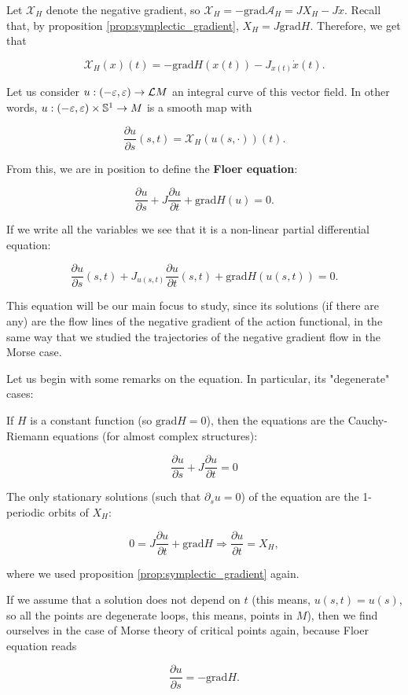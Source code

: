 Let $\mathcal{X}_H$ denote the negative gradient, so $\mathcal{X}_H = - \text{grad}\mathcal{A}_H = J X_H - J \dot{x}$. Recall that, by proposition \ref{prop:symplectic_gradient}, $X_H = J \text{grad} H$. Therefore, we get that

$$\mathcal{X}_H(x)(t) = - \text{grad}H(x(t)) - J_{x(t)} \dot{x}(t) .$$

Let us consider $u : (-\varepsilon,\varepsilon) \rightarrow \mathcal{L}M$ an integral curve of this vector field. In other words, $u : (-\varepsilon,\varepsilon) \times \mathbb{S}^1 \rightarrow M$ is a smooth map with

$$\frac{\partial u}{\partial s} (s,t) = \mathcal{X}_H(u(s,\cdot)) (t) .$$

From this, we are in position to define the {\bf Floer equation}:

\begin{equation} \label{equation:floer_equation}
\frac{\partial u}{\partial s} + J \frac{\partial u}{\partial t} + \text{grad}H(u) = 0 .
\end{equation}

If we write all the variables we see that it is a non-linear partial differential equation:

$$\frac{\partial u}{\partial s}(s,t) + J_{u(s,t)} \frac{\partial u}{\partial t}(s,t) + \text{grad}H(u(s,t)) = 0 .$$

This equation will be our main focus to study, since its solutions (if there are any) are the flow lines of the negative gradient of the action functional, in the same way that we studied the trajectories of the negative gradient flow in the Morse case.

Let us begin with some remarks on the equation. In particular, its "degenerate" cases:

\begin{rmrk}
If $H$ is a constant function (so $\text{grad}H = 0$), then the equations are the Cauchy-Riemann equations (for almost complex structures):

$$\frac{\partial u}{\partial s} + J \frac{\partial u}{\partial t} = 0$$
\end{rmrk}

\begin{rmrk}
The only stationary solutions (such that $\partial_s u = 0$) of the equation are the 1-periodic orbits of $X_H$:

$$0 = J \frac{\partial u}{\partial t} + \text{grad}H \Rightarrow \frac{\partial u}{\partial t} = X_H ,$$

where we used proposition \ref{prop:symplectic_gradient} again.
\end{rmrk}

\begin{rmrk}
If we assume that a solution does not depend on $t$ (this means, $u(s,t) = u(s)$, so all the points are degenerate loops, this means, points in $M$), then we find ourselves in the case of Morse theory of critical points again, because Floer equation reads

$$\frac{\partial u}{\partial s} = - \text{grad}H .$$
\end{rmrk}
